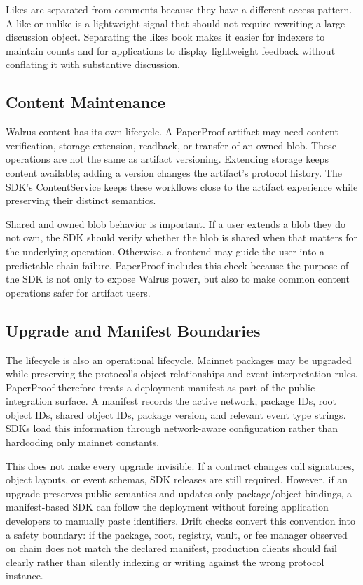 \documentclass[journal]{IEEEtran}
\begin{document}
Likes are separated from comments because they have a different access pattern. A like or unlike is a lightweight signal that should not require rewriting a large discussion object. Separating the likes book makes it easier for indexers to maintain counts and for applications to display lightweight feedback without conflating it with substantive discussion.

\subsection{Content Maintenance}

Walrus content has its own lifecycle. A PaperProof artifact may need content verification, storage extension, readback, or transfer of an owned blob. These operations are not the same as artifact versioning. Extending storage keeps content available; adding a version changes the artifact's protocol history. The SDK's ContentService keeps these workflows close to the artifact experience while preserving their distinct semantics.

Shared and owned blob behavior is important. If a user extends a blob they do not own, the SDK should verify whether the blob is shared when that matters for the underlying operation. Otherwise, a frontend may guide the user into a predictable chain failure. PaperProof includes this check because the purpose of the SDK is not only to expose Walrus power, but also to make common content operations safer for artifact users.

\subsection{Upgrade and Manifest Boundaries}

The lifecycle is also an operational lifecycle. Mainnet packages may be upgraded while preserving the protocol's object relationships and event interpretation rules. PaperProof therefore treats a deployment manifest as part of the public integration surface. A manifest records the active network, package IDs, root object IDs, shared object IDs, package version, and relevant event type strings. SDKs load this information through network-aware configuration rather than hardcoding only mainnet constants.

This does not make every upgrade invisible. If a contract changes call signatures, object layouts, or event schemas, SDK releases are still required. However, if an upgrade preserves public semantics and updates only package/object bindings, a manifest-based SDK can follow the deployment without forcing application developers to manually paste identifiers. Drift checks convert this convention into a safety boundary: if the package, root, registry, vault, or fee manager observed on chain does not match the declared manifest, production clients should fail clearly rather than silently indexing or writing against the wrong protocol instance.
\end{document}
